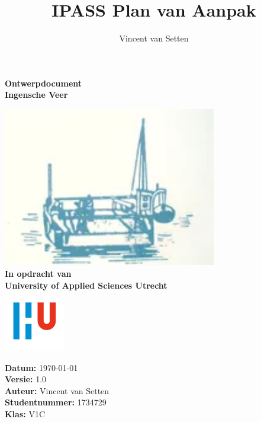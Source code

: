 \documentclass{article}
\title{IPASS Plan van Aanpak}
\author{Vincent van Setten}
\begin{document}
\begin{titlepage}
    \begin{center}
        \vspace*{.6cm}
        \Huge
        \textbf{Ontwerpdocument }\\
        \vspace{0.2cm}
        \LARGE 
        \textbf{Ingensche Veer} \\
  
        \normalsize
  
  
        \vspace{1cm}
        \includegraphics[width=0.7\textwidth]{images/iv.png}
        \vspace{1cm}
        \Large\\
        \textbf{In opdracht van}\\
        \large
        \textbf{University of Applied Sciences Utrecht} \\
        \includegraphics[width=0.2\textwidth]{images/logouni.jpg}
  
        \vfill
      \end{center}
      \textbf{Datum:} \today \\
      \textbf{Versie:} 1.0 \\
      \textbf{Auteur:} Vincent van Setten \\
      \textbf{Studentnummer:} 1734729 \\
      \textbf{Klas:} V1C\\
  
  \end{titlepage}
  
\end{document}
